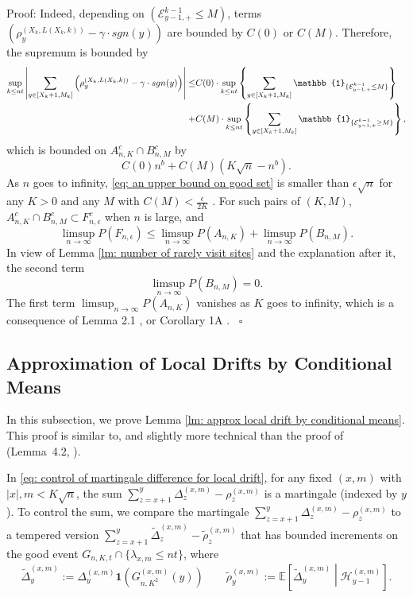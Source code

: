 \documentclass[twoside,12pt,a4paper]{article}
\numberwithin{equation}{section}
\newenvironment{proof}[1][Proof]{{\sc #1}:}{~\hfill $\square$}
\newcommand{\abs}[1]{\left\vert #1 \right\vert}
\begin{document}
\begin{proof}
		Indeed, depending on $(\mathcal{E}^{k-1}_{y-1,+} \leq M)$, terms  $\left( \rho^{(X_k,L(X_k,k))}_y -  \gamma \cdot sgn(y) \right)$ are bounded by $C(0)$ or $C(M)$. Therefore, the supremum is bounded by
		\begin{align*}
			\sup_{k\leq n t}  \abs{  	\sum_{y\in [X_{k}+1 ,M_k]} \left( \rho^{(X_k,L(X_k,k))}_y -  \gamma \cdot sgn(y) \right) } \leq &  
			C(0) \cdot \sup_{k\leq n t} \left\{   	\sum_{y\in [X_{k}+1 ,M_k]} \mathbb{1}_{ \{ \mathcal{E}^{k-1}_{y-1,+} \leq M \} } \right\}
			\notag
			\\
			+& C(M) \cdot \sup_{k\leq n t} \left\{   	\sum_{y\in [X_{k}+1 ,M_k]} \mathbb{1}_{ \{ \mathcal{E}^{k-1}_{y-1,+} \geq M \} } \right\},
		\end{align*} which is bounded on $A^c_{n,K} \cap B^c_{n,M}$ by
		\begin{equation}\label{eq: an upper bound on good set}
			C(0)n^b  + C(M) \left(K \sqrt{n} -n^b\right).
		\end{equation} As $n$ goes to infinity, \eqref{eq: an upper bound on good set} is smaller than $\epsilon \sqrt{n}$ for any $K>0$ and any $M$ with $C(M) < \frac{\epsilon}{2K}$ . 
		For such pairs of $(K,M)$, $A^c_{n,K} \cap B^c_{n,M} \subset F^c_{n,\epsilon}$ when $n$ is large,  and 
		$$
		\limsup_{n\to \infty} P(F_{n,\epsilon}) \leq \limsup_{n\to \infty}  P(A_{n,K}) +  \limsup_{n\to \infty}  P(B_{n,M}).
		$$ In view of Lemma \ref{lm: number of rarely visit sites} and the explanation after it, the second term $$\limsup_{n\to \infty}  P(B_{n,M})=0.$$  The first term $\limsup_{n\to \infty}  P(A_{n,K}) $ vanishes as $K$ goes to infinity, which is a consequence of Lemma 2.1 \cite{KMP22}, or Corollary 1A \cite{T96}.
	\end{proof}
	
	
	\subsection{Approximation of Local Drifts by Conditional Means}
	\label{sec:DeltaRho}
	In this subsection, we prove Lemma \ref{lm: approx local drift by conditional means}. This proof is similar to, and slightly more technical than the proof of (Lemma~4.2, \cite{KP16}). 
	
	In \eqref{eq: control of martingale difference for local drift}, for any fixed $(x,m)$ with $\abs{x},m < K\sqrt{n}$, the sum $\sum_{z=x+1}^{y}  \Delta_z^{(x,m)} - \rho_z^{(x,m)}  $ is a martingale (indexed by $y$). To control the sum, we compare the martingale $\sum_{z=x+1}^{y} \Delta_z^{(x,m)} - \rho_z^{(x,m)}$ to a tempered version $\sum_{z= x+1}^y \tilde \Delta_{z}^{(x,m)} - \tilde\rho_z^{(x,m)}$ that has bounded increments on the good event $G_{n, K, t} \cap \{\lambda_{x,m} \leq nt \}$, where
	\[
	\tilde \Delta_y^{(x,m)} := \Delta_y ^{(x,m)} \mathbf{1}\left( G_{n, K^2}^{(x,m)} (y)\right) \qquad
	\tilde \rho_y^{(x,m)} := \mathbb{E}\left[ \tilde\Delta_y^{(x,m)} \middle| \mathcal{H}_{y-1}^{(x,m)} \right]  
	.\] 
	
\end{document}
